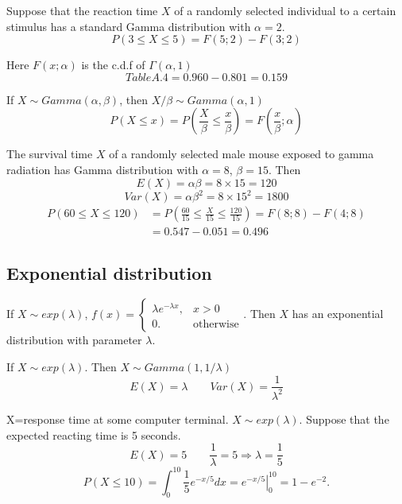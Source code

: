 \begin{exmp}
Suppose that the reaction time $X$ of a randomly selected individual to a certain stimulus has a standard Gamma distribution with $\alpha=2$.
\[P(3 \leq X \leq 5)=F(5;2)-F(3;2)\]

Here $F(x;\alpha)$ is the c.d.f of $\Gamma(\alpha,1)$
\[Table A.4=0.960-0.801=0.159\]
\end{exmp}

\begin{prop}
If $X\sim Gamma(\alpha,\beta)$, then $X/\beta \sim Gamma(\alpha,1)$
\[P(X\leq x)=P\left(\frac{X}{\beta} \leq \frac{x}{\beta}\right)=F\left(\frac{x}{\beta};\alpha \right)\]
\end{prop}

\begin{exmp}
The survival time $X$ of a randomly selected male mouse exposed to gamma radiation has Gamma distribution with $\alpha=8$, $\beta=15$. Then
\[E(X)=\alpha\beta =8 \times 15 =120\]
\[Var(X)=\alpha \beta^2 =8 \times 15^2 =1800\]
\begin{align*}
P(60 \leq X \leq 120)&=P\left(\frac{60}{15}\leq\frac{X}{15} \leq\frac{120}{15} \right)=F(8;8)-F(4;8) \\
&=0.547-0.051=0.496
\end{align*}
\end{exmp}

\subsection{Exponential distribution}
If $X\sim exp(\lambda)$,
$f(x)=\begin{cases}
\lambda e^{-\lambda x}, 	& x >0\\
0. &\text{otherwise}
\end{cases}$. Then $X$ has an exponential distribution with parameter $\lambda$.

\begin{prop}
If $X\sim exp(\lambda)$. Then $X \sim Gamma(1,1/\lambda)$
\[E(X)=\lambda \qquad Var(X)=\frac{1}{\lambda^2}\]
\end{prop}

\begin{exmp}
X=response time at some computer terminal. $X \sim exp(\lambda)$. Suppose that the expected reacting time is 5 seconds.
\[E(X)=5 \qquad \frac{1}{\lambda}=5 \Rightarrow \lambda=\frac{1}{5}\]
\[P(X\leq 10)=\int_0^{10} \frac{1}{5} e^{-x/5} dx=\left. e^{-x/5}\right|_{0}^{10}=1-e^{-2}. \]
\end{exmp}

